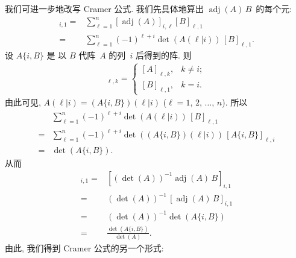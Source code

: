 \documentclass[../libro.tex]{subfiles}
\begin{document}
我们可进一步地改写 Cramer 公式.
我们先具体地算出
\(\operatorname{adj} {(A)}\,B\)~的每个元:
\begin{align*}
    [\operatorname{adj} {(A)}\,B]_{i,1}
    = {} &
    \sum_{\ell = 1}^{n}
    {[\operatorname{adj} {(A)}]_{i,\ell} [B]_{\ell,1}}
    \\
    = {} &
    \sum_{\ell = 1}^{n}
    {(-1)^{\ell+i} \det {(A(\ell|i))}\, [B]_{\ell,1}}.
\end{align*}
设 \(A \{i, B\}\) 是%
以 \(B\) 代阵~\(A\) 的列~\(i\) 后得到的阵.
则
\begin{align*}
    [A \{i, B\}]_{\ell,k} =
    \begin{cases}
        [A]_{\ell,k}, & k \neq i; \\
        [B]_{\ell,1}, & k = i.
    \end{cases}
\end{align*}
由此可见,
\(A(\ell|i) = (A \{i, B\})(\ell|i)\)
(\(\ell = 1\), \(2\), \(\dots\), \(n\)).
所以
\begin{align*}
    &
    \sum_{\ell = 1}^{n}
    {(-1)^{\ell+i} \det {(A(\ell|i))}\, [B]_{\ell,1}}
    \\
    = {} &
    \sum_{\ell = 1}^{n}
    {(-1)^{\ell+i} \det {((A \{i, B\})(\ell|i))}\,
    [A \{i, B\}]_{\ell,i}}
    \\
    = {} &
    \det {(A \{i, B\})}.
\end{align*}
从而
\begin{align*}
    [X]_{i,1}
    = {} &
    [(\det {(A)})^{-1} \operatorname{adj} {(A)}\,B]_{i,1}
    \\
    = {} &
    (\det {(A)})^{-1}\, [\operatorname{adj} {(A)}\,B]_{i,1}
    \\
    = {} &
    (\det {(A)})^{-1} \det {(A \{i, B\})}
    \\
    = {} &
    \frac{\det {(A \{i, B\})}}{\det {(A)}}.
\end{align*}
由此, 我们得到 Cramer 公式的另一个形式:
\end{document}

